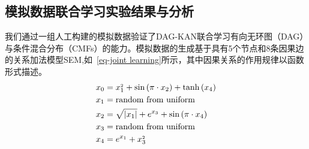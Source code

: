 \subsection{模拟数据联合学习实验结果与分析}

我们通过一组人工构建的模拟数据验证了DAG-KAN联合学习有向无环图（DAG）与条件混合分布（CMFs）的能力。模拟数据的生成基于具有5个节点和8条因果边的关系加法模型SEM,如~\ref{eq-joint learning}所示，其中因果关系的作用规律以函数形式描述。
\begin{equation}
	\begin{aligned}
		x_0&=x_{1}^{_2}+\sin \left( \pi \cdot x_2 \right) +\tanh \left( x_4 \right) \\x_1&=\text{random\,\,from\,\,uniform}\\x_2&=\sqrt{\left| x_1 \right|}+e^{x_3}+\sin \left( \pi \cdot x_4 \right) \\x_3&=\text{random\,\,from\,\,uniform}\\x_4&=e^{x_1}+x_{3}^{_2}
	\end{aligned}
	\label{eq-joint learning}
\end{equation}


